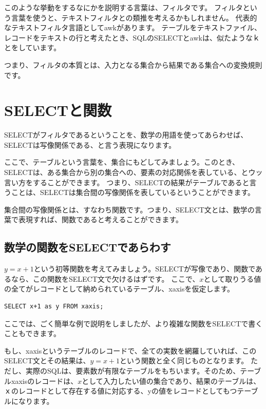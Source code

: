 このような挙動をするなにかを説明する言葉は、フィルタです。
フィルタという言葉を使うと、テキストフィルタとの類推を考えるかもしれません。
代表的なテキストフィルタ言語としてawkがあります。
テーブルをテキストファイル、レコードをテキストの行と考えたとき、SQLのSELECTとawkは、似たようなｋとをしています。

つまり、フィルタの本質とは、入力となる集合から結果である集合への変換規則です。











\section{SELECTと関数}

SELECTがフィルタであるということを、数学の用語を使ってあらわせば、SELECTは写像関係である、と言う表現になります。

ここで、テーブルという言葉を、集合にもどしてみましょう。このとき、SELECTは、ある集合から別の集合への、要素の対応関係を表している、とウッ言い方をすることができます。
つまり、SELECTの結果がテーブルであると言うことは、SELECTは集合間の写像関係を表しているということができます。

集合間の写像関係とは、すなわち関数です。つまり、SELECT文とは、数学の言葉で表現すれば、関数であると考えることができます。

\subsection{数学の関数をSELECTであらわす}

$y=x+1$という初等関数を考えてみましょう。SELECTが写像であり、関数であるなら、この関数をSELECT文で欠けるはずです。
ここで、$x$として取りうる値の全てがレコードとして納められているテーブル、xaxisを仮定します。

\begin{verbatim}
SELECT x+1 as y FROM xaxis;
\end{verbatim}

ここでは、ごく簡単な例で説明をしましたが、より複雑な関数をSELECTで書くこともできます。

もし、xaxisというテーブルのレコードで、全ての実数を網羅していれば、このSELECT文とその結果は、$y=x+1$という関数と全く同じものとなります。
ただし、実際のSQLは、要素数が有限なテーブルをもちいます。そのため、テーブルxaxisのレコードは、$x$として入力したい値の集合であり、結果のテーブルは、ｘのレコードとして存在する値に対応する、yの値をレコードとしてもつテーブルになります。

